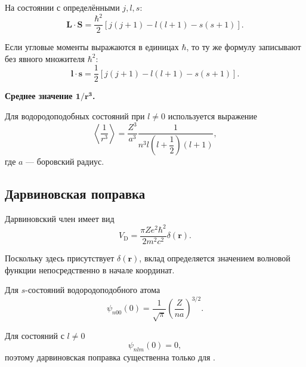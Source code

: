 \documentclass[../final.tex]{subfiles}
\begin{document}
На состоянии с определёнными $j,l,s$:
%
\begin{equation*}
    \mathbf L\cdot\mathbf S
    =
    \frac{\hbar^2}{2}
    \left[
        j(j+1)
        -
        l(l+1)
        -
        s(s+1)
    \right].
\end{equation*}

Если угловые моменты выражаются в единицах $\hbar$, то ту же формулу
записывают без явного множителя $\hbar^2$:
%
\begin{equation*}
    \mathbf l\cdot\mathbf s
    =
    \frac{1}{2}
    \left[
        j(j+1)
        -
        l(l+1)
        -
        s(s+1)
    \right].
\end{equation*}


\medskip
\noindent\textbf{Среднее значение $\boldsymbol{1/r^3}$.}

Для водородоподобных состояний при $l\neq0$ используется выражение
%
\begin{equation*}
    \left\langle
        \frac{1}{r^3}
    \right\rangle
    =
    \frac{Z^3}{a^3}
    \frac{1}{
        n^3
        l
        \left(l+\dfrac12\right)
        (l+1)
    },
\end{equation*}
%
где $a$ --- боровский радиус.


\subsection{Дарвиновская поправка}

Дарвиновский член имеет вид
%
\[
    V_{\mathrm D}
    =
    \frac{\pi Ze^2\hbar^2}{2m^2c^2}
    \delta(\mathbf r).
\]

Поскольку здесь присутствует $\delta(\mathbf r)$, вклад определяется
значением волновой функции непосредственно в начале координат.

Для $s$-состояний водородоподобного атома
%
\begin{equation*}
    \psi_{n00}(0)
    =
    \frac{1}{\sqrt{\pi}}
    \left(
        \frac{Z}{na}
    \right)^{3/2}.
\end{equation*}

Для состояний с $l\neq0$
%
\begin{equation*}
    \psi_{nlm}(0)=0,
\end{equation*}
%
поэтому дарвиновская поправка существенна только для
.


\end{document}
